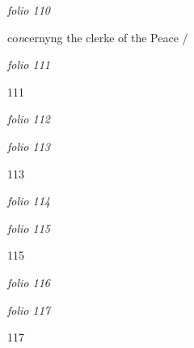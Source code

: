 \documentclass[12pt, a4paper]{book}
\begin{document}

\textit{folio 110}



		\ifthenelse{\isodd{\thepage}}
		{\reversemarginpar}
		{\normalmarginpar}
		co\textit{n}cernyng the
 clerke of the
 Peace /

\dotfill
					

\textit{folio 111}


{\color{Mahogany}111}

\dotfill
					

\textit{folio 112}


         \vspace{4cm}
         
\dotfill
					

\textit{folio 113}


\begin{flushright}{\color{Mahogany}113}\end{flushright}

\dotfill
					

\textit{folio 114}


         \vspace{4cm}
         
\dotfill
					

\textit{folio 115}


\begin{flushright}{\color{Mahogany}115}\end{flushright}

\dotfill
					

\textit{folio 116}


         \vspace{4cm}
         
\dotfill
					

\textit{folio 117}


\begin{flushright}{\color{Mahogany}117}\end{flushright}

\dotfill
					
\end{document}
